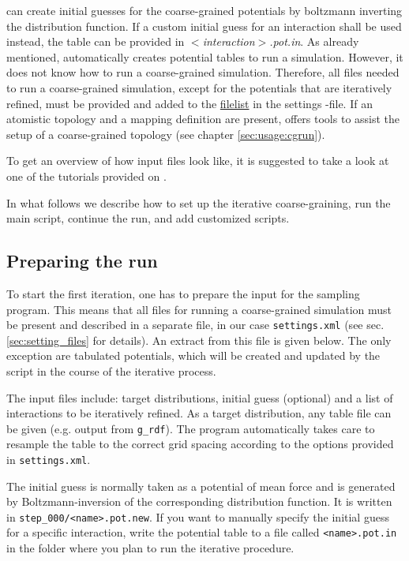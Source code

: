 \votca can create initial guesses for the coarse-grained potentials by boltzmann inverting the distribution function. If a custom initial guess for an interaction shall be used instead, the table can be provided in \textit{$<$interaction$>$.pot.in}. As already mentioned, \votca automatically creates potential tables to run a simulation. However, it does not know how to run a coarse-grained simulation. Therefore, all files needed to run a coarse-grained simulation, except for the potentials that are iteratively refined, must be provided and added to the \hyperlink{\cgref{inverse.filelist}}{filelist} in the settings \xml-file. If an atomistic topology and a mapping definition are present, \votca offers tools to assist the setup of a  coarse-grained topology (see chapter \ref{sec:usage:cgrun}).

To get an overview of how input files look like, it is suggested to take a look at one of the tutorials provided on \votcaweb.

In what follows we describe how to set up the iterative coarse-graining, run the main script, continue the run, and add customized scripts. 

\subsection{Preparing the run}
\label{sec:preparing_the_run}
To start the first iteration, one has to prepare the input for the sampling program. This means that all files for running a coarse-grained simulation must be present and described in a separate \xml file, in our case \texttt{settings.xml} (see sec. \ref{sec:setting_files} for details). An extract from this file is given below. The only exception are tabulated potentials, which will be created and updated by the script in the course of the iterative process.

The input files include: target distributions, initial guess (optional) and a list of interactions to be iteratively refined. As a target distribution, any table file can be given (e.g. \gromacs output from \texttt{g\_rdf}). The program automatically takes care to resample the table to the correct grid spacing according to the options provided in \texttt{settings.xml}.

The initial guess is normally taken as a potential of mean force and is generated by Boltzmann-inversion of the corresponding distribution function. It is written in \texttt{step\_000/<name>.pot.new}. If you want to manually specify the initial guess for a specific interaction, write the potential table to a file called \texttt{<name>.pot.in} in the folder where you plan to run the iterative procedure.

